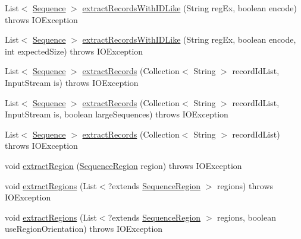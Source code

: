 \begin{DoxyCompactItemize}
\item 
List$<$ \hyperlink{classbroad_1_1core_1_1sequence_1_1_sequence}{Sequence} $>$ \hyperlink{classbroad_1_1core_1_1sequence_1_1_fasta_sequence_i_o_a0b3c106b3efe0286a3fdc77837423f44}{extract\+Records\+With\+I\+D\+Like} (String reg\+Ex, boolean encode)  throws I\+O\+Exception 
\item 
List$<$ \hyperlink{classbroad_1_1core_1_1sequence_1_1_sequence}{Sequence} $>$ \hyperlink{classbroad_1_1core_1_1sequence_1_1_fasta_sequence_i_o_af6b2eb6246973952e55d45ed01942fe9}{extract\+Records\+With\+I\+D\+Like} (String reg\+Ex, boolean encode, int expected\+Size)  throws I\+O\+Exception 
\item 
List$<$ \hyperlink{classbroad_1_1core_1_1sequence_1_1_sequence}{Sequence} $>$ \hyperlink{classbroad_1_1core_1_1sequence_1_1_fasta_sequence_i_o_aec0fe9f895133ca55cce3f762acc53d7}{extract\+Records} (Collection$<$ String $>$ record\+Id\+List, Input\+Stream is)  throws I\+O\+Exception 
\item 
List$<$ \hyperlink{classbroad_1_1core_1_1sequence_1_1_sequence}{Sequence} $>$ \hyperlink{classbroad_1_1core_1_1sequence_1_1_fasta_sequence_i_o_ae87ed7921463d5f53e471b24e99846c4}{extract\+Records} (Collection$<$ String $>$ record\+Id\+List, Input\+Stream is, boolean large\+Sequences)  throws I\+O\+Exception 
\item 
List$<$ \hyperlink{classbroad_1_1core_1_1sequence_1_1_sequence}{Sequence} $>$ \hyperlink{classbroad_1_1core_1_1sequence_1_1_fasta_sequence_i_o_ab668998a9be3a1b7c26796ddc1c9af44}{extract\+Records} (Collection$<$ String $>$ record\+Id\+List)  throws I\+O\+Exception 
\item 
void \hyperlink{classbroad_1_1core_1_1sequence_1_1_fasta_sequence_i_o_a60b0ea063f9b4f160f4b3ed1daa012ab}{extract\+Region} (\hyperlink{classbroad_1_1core_1_1sequence_1_1_sequence_region}{Sequence\+Region} region)  throws I\+O\+Exception 
\item 
void \hyperlink{classbroad_1_1core_1_1sequence_1_1_fasta_sequence_i_o_a6b5afc9ded857a8436cd33d6ab34c230}{extract\+Regions} (List$<$?extends \hyperlink{classbroad_1_1core_1_1sequence_1_1_sequence_region}{Sequence\+Region} $>$ regions)  throws I\+O\+Exception
\item 
void \hyperlink{classbroad_1_1core_1_1sequence_1_1_fasta_sequence_i_o_ae6492131e43a789e70d89651462c9616}{extract\+Regions} (List$<$?extends \hyperlink{classbroad_1_1core_1_1sequence_1_1_sequence_region}{Sequence\+Region} $>$ regions, boolean use\+Region\+Orientation)  throws I\+O\+Exception
\item 

\end{DoxyCompactItemize}
